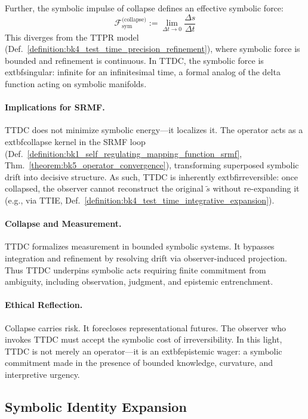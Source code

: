 \begin{scholium}
Further, the symbolic impulse of collapse defines an effective symbolic force:
\[
\mathcal{F}_{\text{sym}}^{\text{(collapse)}} := \lim_{\Delta t \to 0} \frac{\Delta s}{\Delta t}
\]
This diverges from the TTPR model (Def.~\ref{definition:bk4_test_time_precision_refinement}), where symbolic force is bounded and refinement is continuous. In TTDC, the symbolic force is 	extbf{singular}: infinite for an infinitesimal time, a formal analog of the delta function acting on symbolic manifolds.

\paragraph{Implications for SRMF.} TTDC does not minimize symbolic energy---it localizes it. The operator acts as a 	extbf{collapse kernel} in the SRMF loop (Def.~\ref{definition:bk1_self_regulating_mapping_function_srmf}, Thm.~\ref{theorem:bk5_operator_convergence}), transforming superposed symbolic drift into decisive structure. As such, TTDC is inherently 	extbf{irreversible}: once collapsed, the observer cannot reconstruct the original $\tilde{s}$ without re-expanding it (e.g., via TTIE, Def.~\ref{definition:bk4_test_time_integrative_expansion}).

\paragraph{Collapse and Measurement.} TTDC formalizes measurement in bounded
symbolic systems. It bypasses integration and refinement by resolving drift via
observer-induced projection. Thus TTDC underpins symbolic acts requiring finite
commitment from ambiguity, including observation, judgment, and epistemic
entrenchment.

\paragraph{Ethical Reflection.} Collapse carries risk. It forecloses representational futures. The observer who invokes TTDC must accept the symbolic cost of irreversibility. In this light, TTDC is not merely an operator---it is an 	extbf{epistemic wager}: a symbolic commitment made in the presence of bounded knowledge, curvature, and interpretive urgency.

\end{scholium}

\subsection{Symbolic Identity Expansion}
\label{subsec:bk4_symbolic_identity_expansion}

